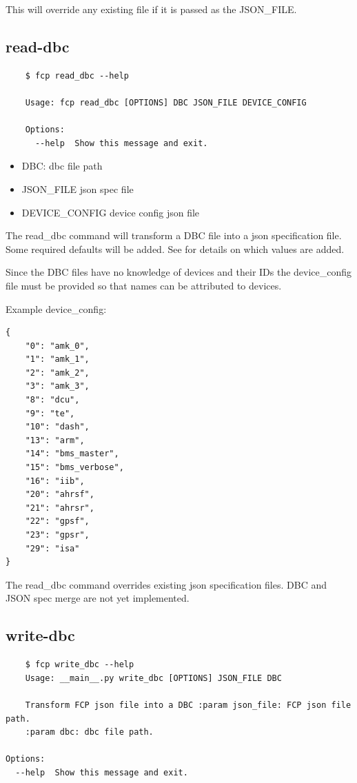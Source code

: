 \documentclass[11pt, a4paper]{article}
\begin{document}
\danger This will override any existing file if it is passed as the JSON\_FILE.

\subsection{read-dbc}
\label{sec:usage:read-dbc}

\begin{verbatim}
	$ fcp read_dbc --help

	Usage: fcp read_dbc [OPTIONS] DBC JSON_FILE DEVICE_CONFIG

	Options:
	  --help  Show this message and exit.
\end{verbatim}

\begin{itemize}
	\item DBC: dbc file path
	\item JSON\_FILE json spec file
	\item DEVICE\_CONFIG device config json file
\end{itemize}

The read\_dbc command will transform a DBC file into a json specification file.
Some required defaults will be added. See  for details on
which values are added.

Since the DBC files have no knowledge of devices and their IDs the
device\_config file must be provided so that names can be attributed to
devices.

Example device\_config:
\begin{verbatim}
{
	"0": "amk_0",
	"1": "amk_1",
	"2": "amk_2",
	"3": "amk_3",
	"8": "dcu",
	"9": "te",
	"10": "dash",
	"13": "arm",
	"14": "bms_master",
	"15": "bms_verbose",
	"16": "iib",
	"20": "ahrsf",
	"21": "ahrsr",
	"22": "gpsf",
	"23": "gpsr",
	"29": "isa"
}
\end{verbatim}

\danger The read\_dbc command overrides existing json specification files. DBC
and JSON spec merge are not yet implemented.


\subsection{write-dbc}
\label{sec:usage:write-dbc}

\begin{verbatim}
	$ fcp write_dbc --help
	Usage: __main__.py write_dbc [OPTIONS] JSON_FILE DBC

	Transform FCP json file into a DBC :param json_file: FCP json file path.
	:param dbc: dbc file path.

Options:
  --help  Show this message and exit.
\end{verbatim}
\end{document}
